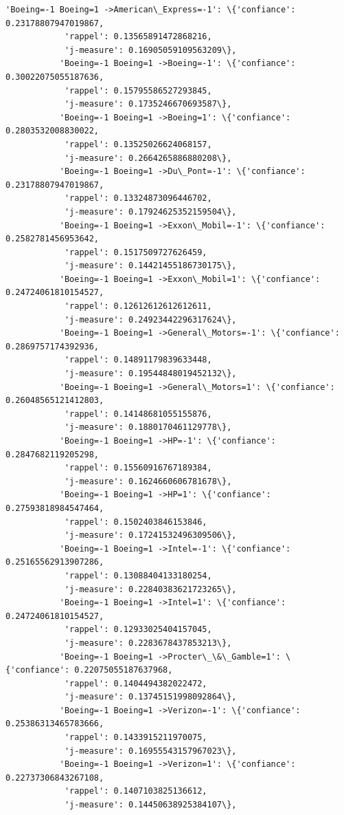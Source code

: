 \documentclass[11pt]{article}
\begin{document}
\begin{Verbatim}[commandchars=\\\{\}]
           'Boeing=-1 Boeing=1 ->American\_Express=-1': \{'confiance': 0.23178807947019867,
            'rappel': 0.13565891472868216,
            'j-measure': 0.16905059109563209\},
           'Boeing=-1 Boeing=1 ->Boeing=-1': \{'confiance': 0.30022075055187636,
            'rappel': 0.15795586527293845,
            'j-measure': 0.1735246670693587\},
           'Boeing=-1 Boeing=1 ->Boeing=1': \{'confiance': 0.2803532008830022,
            'rappel': 0.13525026624068157,
            'j-measure': 0.2664265886880208\},
           'Boeing=-1 Boeing=1 ->Du\_Pont=-1': \{'confiance': 0.23178807947019867,
            'rappel': 0.13324873096446702,
            'j-measure': 0.17924625352159504\},
           'Boeing=-1 Boeing=1 ->Exxon\_Mobil=-1': \{'confiance': 0.2582781456953642,
            'rappel': 0.1517509727626459,
            'j-measure': 0.14421455186730175\},
           'Boeing=-1 Boeing=1 ->Exxon\_Mobil=1': \{'confiance': 0.24724061810154527,
            'rappel': 0.12612612612612611,
            'j-measure': 0.24923442296317624\},
           'Boeing=-1 Boeing=1 ->General\_Motors=-1': \{'confiance': 0.2869757174392936,
            'rappel': 0.14891179839633448,
            'j-measure': 0.19544848019452132\},
           'Boeing=-1 Boeing=1 ->General\_Motors=1': \{'confiance': 0.26048565121412803,
            'rappel': 0.14148681055155876,
            'j-measure': 0.1880170461129778\},
           'Boeing=-1 Boeing=1 ->HP=-1': \{'confiance': 0.2847682119205298,
            'rappel': 0.15560916767189384,
            'j-measure': 0.1624660606781678\},
           'Boeing=-1 Boeing=1 ->HP=1': \{'confiance': 0.27593818984547464,
            'rappel': 0.1502403846153846,
            'j-measure': 0.17241532496309506\},
           'Boeing=-1 Boeing=1 ->Intel=-1': \{'confiance': 0.25165562913907286,
            'rappel': 0.13088404133180254,
            'j-measure': 0.22840383621723265\},
           'Boeing=-1 Boeing=1 ->Intel=1': \{'confiance': 0.24724061810154527,
            'rappel': 0.12933025404157045,
            'j-measure': 0.2283678437853213\},
           'Boeing=-1 Boeing=1 ->Procter\_\&\_Gamble=1': \{'confiance': 0.22075055187637968,
            'rappel': 0.1404494382022472,
            'j-measure': 0.13745151998092864\},
           'Boeing=-1 Boeing=1 ->Verizon=-1': \{'confiance': 0.25386313465783666,
            'rappel': 0.1433915211970075,
            'j-measure': 0.16955543157967023\},
           'Boeing=-1 Boeing=1 ->Verizon=1': \{'confiance': 0.22737306843267108,
            'rappel': 0.1407103825136612,
            'j-measure': 0.14450638925384107\},

\end{Verbatim}
\end{document}
